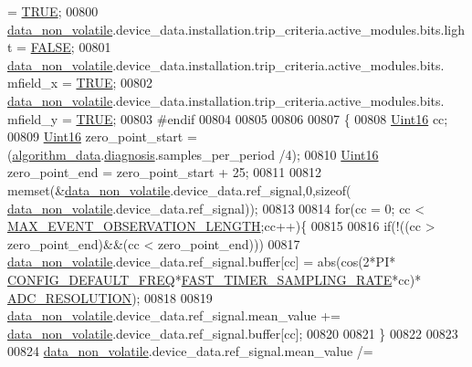 \begin{DoxyCode}
              = \hyperlink{a00040_aa8cecfc5c5c054d2875c03e77b7be15d}{TRUE};
00800         \hyperlink{a00060_a76ac5f917f5308dcd83de0d7c94559fb}{data\_non\_volatile}.device\_data.installation.trip\_criteria.active\_modules.bits.light
              = \hyperlink{a00040_aa93f0eb578d23995850d61f7d61c55c1}{FALSE};
00801         \hyperlink{a00060_a76ac5f917f5308dcd83de0d7c94559fb}{data\_non\_volatile}.device\_data.installation.trip\_criteria.active\_modules.bits.
      mfield\_x     = \hyperlink{a00040_aa8cecfc5c5c054d2875c03e77b7be15d}{TRUE};
00802         \hyperlink{a00060_a76ac5f917f5308dcd83de0d7c94559fb}{data\_non\_volatile}.device\_data.installation.trip\_criteria.active\_modules.bits.
      mfield\_y     = \hyperlink{a00040_aa8cecfc5c5c054d2875c03e77b7be15d}{TRUE};
00803 \textcolor{preprocessor}{#endif}
00804 
00805 
00806 
00807     \{
00808         \hyperlink{a00072_a59a9f6be4562c327cbfb4f7e8e18f08b}{Uint16} cc;
00809         \hyperlink{a00072_a59a9f6be4562c327cbfb4f7e8e18f08b}{Uint16} zero\_point\_start = (\hyperlink{a00016_a183caa40cd01e79ee309cc9c4a225197}{algorithm\_data}.\hyperlink{a00016_a16f85d57ec98b4ad05f5a2e10536b3c6}{diagnosis}.samples\_per\_period
      /4);
00810         \hyperlink{a00072_a59a9f6be4562c327cbfb4f7e8e18f08b}{Uint16} zero\_point\_end   = zero\_point\_start + 25;
00811 
00812         memset(&\hyperlink{a00060_a76ac5f917f5308dcd83de0d7c94559fb}{data\_non\_volatile}.device\_data.ref\_signal,0,\textcolor{keyword}{sizeof}(
      \hyperlink{a00060_a76ac5f917f5308dcd83de0d7c94559fb}{data\_non\_volatile}.device\_data.ref\_signal));
00813 
00814         \textcolor{keywordflow}{for}(cc = 0; cc < \hyperlink{a00022_aa060aeb1ecb530b3c6f6d91060999b70}{MAX\_EVENT\_OBSERVATION\_LENGTH};cc++)\{
00815 
00816         \textcolor{keywordflow}{if}(!((cc > zero\_point\_end)&&(cc < zero\_point\_end)))
00817         \hyperlink{a00060_a76ac5f917f5308dcd83de0d7c94559fb}{data\_non\_volatile}.device\_data.ref\_signal.buffer[cc]  = abs(cos(2*PI*
      \hyperlink{a00021_a985a153b3edd3d7d638137ae0b9e5e67}{CONFIG\_DEFAULT\_FREQ}*\hyperlink{a00021_a3a4dcb8af26a561d90607a41a3745806}{FAST\_TIMER\_SAMPLING\_RATE}*cc)*
      \hyperlink{a00058_a00978ca9e8220475258dcbbbb7d29129}{ADC\_RESOLUTION});
00818 
00819         \hyperlink{a00060_a76ac5f917f5308dcd83de0d7c94559fb}{data\_non\_volatile}.device\_data.ref\_signal.mean\_value +=
      \hyperlink{a00060_a76ac5f917f5308dcd83de0d7c94559fb}{data\_non\_volatile}.device\_data.ref\_signal.buffer[cc];
00820 
00821         \}
00822 
00823 
00824           \hyperlink{a00060_a76ac5f917f5308dcd83de0d7c94559fb}{data\_non\_volatile}.device\_data.ref\_signal.mean\_value /=

\end{DoxyCode}
